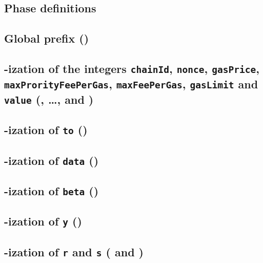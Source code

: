 \subsection{Phase definitions}              \label{rlptxn: phase definitions}                 

\subsection{Global \rlp{} prefix (\phaseRlpPrefix)}                                           
\subsection{\rlp{}-ization of the integers
\texttt{chainId},
\texttt{nonce},
\texttt{gasPrice},
\texttt{maxProrityFeePerGas},
\texttt{maxFeePerGas},
\texttt{gasLimit} and \texttt{value} (\phaseChainId{}, \dots, \phaseGasLimit{} and \phaseValue{})}
                                                                                              
\subsection{\rlp{}-ization of \texttt{to} (\phaseTo)}                                             
\subsection{\rlp{}-ization of \texttt{data} (\phaseData)}                                     
\subsection{\rlp{}-ization of \texttt{beta} (\phaseBeta)}                                     
\subsection{\rlp{}-ization of \texttt{y} (\phaseY)}                                           
\subsection{\rlp{}-ization of \texttt{r} and \texttt{s} (\phaseR{} and \phaseS)}              
